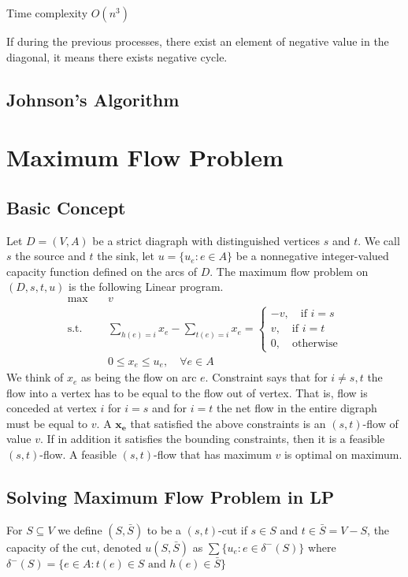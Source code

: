 			Time complexity $O(n^3)$

			If during the previous processes, there exist an element of negative value in the diagonal, it means there exists negative cycle.

		\section{Johnson's Algorithm}

	\chapter{Maximum Flow Problem}
		\section{Basic Concept}
			Let $D=(V, A)$ be a strict diagraph with distinguished vertices $s$ and $t$. We call $s$ the source and $t$ the sink, let $u=\{u_e: e\in A\}$ be a nonnegative integer-valued capacity function defined on the arcs of $D$. The maximum flow problem on $(D, s, t, u)$ is the following Linear program.
			\begin{align}
				\max \quad & v\\
				\text{s.t.} \quad & \sum_{h(e)=i}x_e - \sum_{t(e) = i} x_e = \begin{cases}
					-v, \quad \text{if } i = s\\
					v, \quad \text{if } i = t \\
					0, \quad \text{otherwise}
				\end{cases}\\
				& 0\le x_e \le u_e, \quad \forall e\in A
			\end{align}
			We think of $x_e$ as being the flow on arc $e$. Constraint says that for $i \neq s, t$ the flow into a vertex has to be equal to the flow out of vertex. That is, flow is conceded at vertex $i$ for $i=s$ and for $i=t$ the net flow in the entire digraph must be equal to $v$.
			A $\mathbf{x_e}$ that satisfied the above constraints is an $(s,t)$-flow of value $v$. If in addition it satisfies the bounding constraints, then it is a feasible $(s,t)$-flow.
			A feasible $(s,t)$-flow that has maximum $v$ is optimal on maximum.

		\section{Solving Maximum Flow Problem in LP}
			\begin{theorem}
				For $S \subseteq V$ we define $(S, \bar{S})$ to be a $(s, t)$-cut if $s\in S$ and $t\in \bar{S}=V-S$, the capacity of the cut, denoted $u(S, \bar{S})$ as $\sum \{u_e: e\in \delta^-(S)\}$ where $\delta^-(S) = \{e\in A: t(e) \in S \text{ and } h(e) \in \bar{S}\}$
			\end{theorem}

